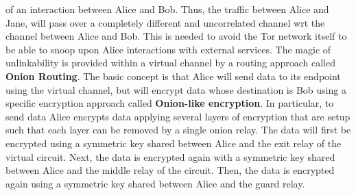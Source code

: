 of an interaction between Alice and Bob. Thus, the traffic between Alice and Jane, will pass over a completely different and uncorrelated channel wrt the channel between Alice and Bob. This is needed to avoid the Tor network itself to be able to snoop upon Alice interactions with external services. The magic of unlinkability is provided within a virtual channel by a routing approach called \textbf{Onion Routing}. The basic concept is that Alice will send data to its endpoint using the virtual channel, but will encrypt data whose destination is Bob using a specific encryption approach called \textbf{Onion-like encryption}. In particular, to send data Alice encrypts data applying several layers of encryption that are setup such that each layer can be removed by a single onion relay. The data will first be encrypted using a symmetric key shared between Alice and the exit relay of the virtual circuit. Next, the data is encrypted again with a symmetric key shared between Alice and the middle relay of the circuit. Then, the data is encrypted again using a symmetric key shared between Alice and the guard relay. 

